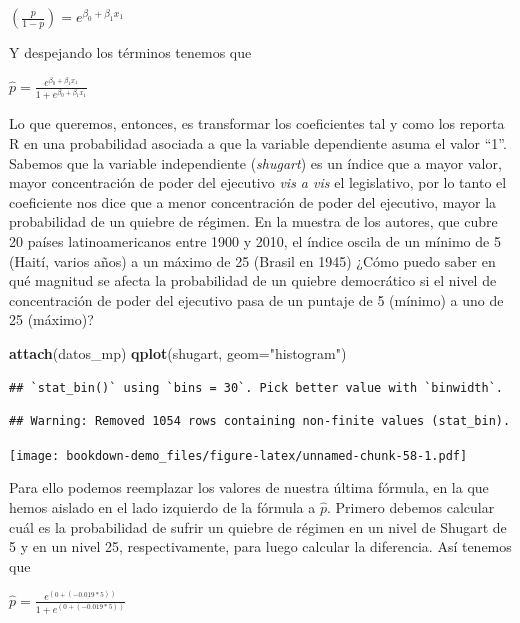 \documentclass[]{book}
\newenvironment{Shaded}{\begin{snugshade}}{\end{snugshade}}
\newcommand{\KeywordTok}[1]{\textcolor[rgb]{0.13,0.29,0.53}{\textbf{#1}}}
\newcommand{\DataTypeTok}[1]{\textcolor[rgb]{0.13,0.29,0.53}{#1}}
\newcommand{\StringTok}[1]{\textcolor[rgb]{0.31,0.60,0.02}{#1}}
\newcommand{\NormalTok}[1]{#1}
\begin{document}
\((\frac {p}{1 - p}) = e^{\beta_{0}+\beta_{1}x_{1}}\)

Y despejando los términos tenemos que

\(\hat{p} = \frac {e^{\beta_{0}+\beta_{1}x_{1}}}{1 + e^{\beta_{0}+\beta_{1}x_{1}}}\)

Lo que queremos, entonces, es transformar los coeficientes tal y como
los reporta R en una probabilidad asociada a que la variable dependiente
asuma el valor ``1''. Sabemos que la variable independiente
(\emph{shugart}) es un índice que a mayor valor, mayor concentración de
poder del ejecutivo \emph{vis a vis} el legislativo, por lo tanto el
coeficiente nos dice que a menor concentración de poder del ejecutivo,
mayor la probabilidad de un quiebre de régimen. En la muestra de los
autores, que cubre 20 países latinoamericanos entre 1900 y 2010, el
índice oscila de un mínimo de 5 (Haití, varios años) a un máximo de 25
(Brasil en 1945) ¿Cómo puedo saber en qué magnitud se afecta la
probabilidad de un quiebre democrático si el nivel de concentración de
poder del ejecutivo pasa de un puntaje de 5 (mínimo) a uno de 25
(máximo)?

\begin{Shaded}
\begin{Highlighting}[]
\KeywordTok{attach}\NormalTok{(datos_mp)}
\KeywordTok{qplot}\NormalTok{(shugart, }\DataTypeTok{geom=}\StringTok{"histogram"}\NormalTok{) }
\end{Highlighting}
\end{Shaded}

\begin{verbatim}
## `stat_bin()` using `bins = 30`. Pick better value with `binwidth`.
\end{verbatim}

\begin{verbatim}
## Warning: Removed 1054 rows containing non-finite values (stat_bin).
\end{verbatim}

\texttt{[image: bookdown-demo\_files/figure-latex/unnamed-chunk-58-1.pdf]}

Para ello podemos reemplazar los valores de nuestra última fórmula, en
la que hemos aislado en el lado izquierdo de la fórmula a \(\hat {p}\).
Primero debemos calcular cuál es la probabilidad de sufrir un quiebre de
régimen en un nivel de Shugart de 5 y en un nivel 25, respectivamente,
para luego calcular la diferencia. Así tenemos que

\(\hat{p} = \frac {e^{(0+(-0.019*5))}}{1 + e^{(0+(-0.019*5))}}\)
\end{document}
